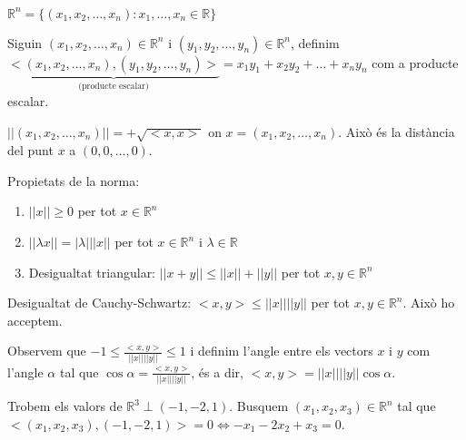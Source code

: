 \documentclass[../main.tex]{subfiles}
\begin{document}
    \begin{definicio}
        $\mathbb{R}^n = \{(x_1, x_2, \dots, x_n): x_1, \dots, x_n \in \mathbb{R}\}$
    \end{definicio}
    \begin{definicio}
        Siguin $(x_1, x_2, \dots, x_n) \in \mathbb{R}^n$ i $(y_1, y_2, \dots, y_n) \in \mathbb{R}^n$,
        definim $\underbrace{<(x_1, x_2, \dots, x_n), (y_1, y_2, \dots, y_n)>}_\text{(producte escalar)} = x_1y_1 + x_2y_2 + \dots + x_ny_n$
        com a producte escalar.
    \end{definicio}
    \begin{definicio}
        $||(x_1, x_2, \dots, x_n)|| = +\sqrt{<x, x>}$ on $x = (x_1, x_2, \dots, x_n)$. Això és
        la distància del punt $x$ a $(0, 0, \dots, 0)$.  
    \end{definicio}
    Propietats de la norma:
    \begin{enumerate}
        \item $||x|| \geq 0$ per tot $x \in \mathbb{R}^n$
        \item $||\lambda x|| = |\lambda| ||x||$ per tot $x \in \mathbb{R}^n$ i $\lambda \in \mathbb{R}$
        \item Desigualtat triangular: $||x+y|| \leq ||x|| + ||y||$ per tot $x, y \in \mathbb{R}^n$
    \end{enumerate}
    Desigualtat de Cauchy-Schwartz: $<x,y> \leq ||x||||y||$ per tot $x, y \in \mathbb{R}^n$. Això ho
    acceptem.
    \begin{obs}
        Observem que $-1 \leq \frac{<x,y>}{||x||||y||} \leq 1$ i definim l'angle entre els vectors $x$ i $y$
        com l'angle $\alpha$ tal que $\cos{\alpha} = \frac{<x,y>}{||x||||y||}$, és a dir, $<x, y> = ||x||||y||\cos{\alpha}$.
    \end{obs}
    \begin{exemple}
        Trobem els valors de $\mathbb{R}^3 \perp (-1, -2, 1)$. Busquem $(x_1, x_2, x_3) \in \mathbb{R}^n$
        tal que $<(x_1, x_2, x_3), (-1, -2, 1)> = 0 \Leftrightarrow -x_1-2x_2+x_3=0$.
    \end{exemple}
\end{document}
